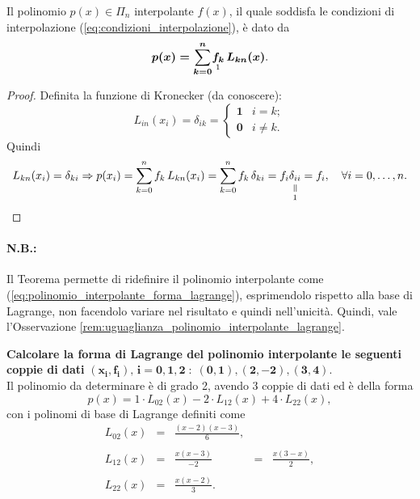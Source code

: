 \begin{theorem}
    Il polinomio $p(x)\in \Pi_n$ interpolante $f(x)$, il quale soddisfa le condizioni di interpolazione (\ref{eq:condizioni_interpolazione}), è dato da 
    \begin{equation}\label{eq:polinomio_interpolante_forma_lagrange}
        \boldsymbol{p(x)=\sum_{k=0}^{n}} \underset{\footnotemark}{\boldsymbol{f_k}}\, \boldsymbol{L_{kn}(x)}.
    \end{equation}
\end{theorem}
\begin{proof}
    Definita la funzione di Kronecker (da conoscere): 
    \begin{equation}\label{eq:formaKronecker}
        L_{in}(x_i)=\delta_{ik} = 
        \begin{cases}
            \boldsymbol 1 & i=k;\\
            \boldsymbol 0 & i\neq k.
        \end{cases}
    \end{equation}
   Quindi
   \begin{equation*}
       L_{kn}(x_i)=\delta_{ki}\Rightarrow p(x_i)=\sum_{k=0}^n f_k\, L_{kn}(x_i) = \sum_{k=0}^n f_k\, \delta_{ki} = f_i \equalto{\delta_{ii}}{1} = f_i,\quad \forall i=0,\hdots,n.
   \end{equation*}
\end{proof}

\paragraph{N.B.:} Il Teorema permette di ridefinire il polinomio interpolante come (\ref{eq:polinomio_interpolante_forma_lagrange}), esprimendolo rispetto alla base di Lagrange, non facendolo variare nel risultato e quindi nell'unicità. Quindi, vale l'Osservazione \ref{rem:uguaglianza_polinomio_interpolante_lagrange}.

\begin{example}
	\textbf{Calcolare la forma di Lagrange del polinomio interpolante le seguenti coppie di dati} $\boldsymbol{(x_i, f_i),\, i=0,1,2\; :\;  (0,1),(2,-2), (3,4)}$.\\
	Il polinomio da determinare è di grado 2, avendo 3 coppie di dati ed è della forma
	\begin{equation*}
		p(x) = 1 \cdot L_{02}(x) - 2 \cdot L_{12}(x) + 4 \cdot L_{22}(x),
	\end{equation*}
	con i polinomi di base di Lagrange definiti come
	\begin{equation*}
		\begin{matrix}
			L_{02}(x) &=& \frac{(x-2)(x-3)}{6},\\\\
			L_{12}(x) &=& \frac{x(x-3)}{-2} &=& \frac{x(3-x)}{2},\\\\
			L_{22}(x) &=& \frac{x(x-2)}{3}.
		\end{matrix}
	\end{equation*}
\end{example}

